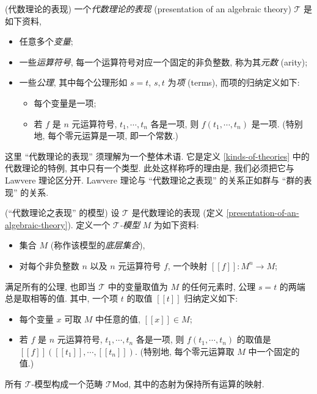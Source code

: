 \begin{definition}
	[label={presentation-of-an-algebraic-theory}]
	{(代数理论的表现)}
	一个\emph{代数理论的表现} (presentation of an algebraic theory) $\mathcal T$ 是如下资料,
	\begin{itemize}
		\item 任意多个\emph{变量};
		\item 一些\emph{运算符号}, 每一个运算符号对应一个固定的非负整数, 称为其\emph{元数} (arity);
		\item 一些\emph{公理}, 其中每个公理形如 $s=t$, $s,t$ 为\emph{项} (terms)\footnotemark{}, 而项的归纳定义如下:
		\begin{itemize}
			\item 每个变量是一项;
			\item 若 $f$ 是 $n$ 元运算符号, $t_1,\cdots,t_n$ 各是一项, 则 $f(t_1,\cdots,t_n)$ 是一项. (特别地, 每个零元运算是一项, 即一个常数.)
		\end{itemize}
	\end{itemize}
\end{definition}

\begin{remark}
	{}
	这里 ``代数理论的表现'' 须理解为一个整体术语. 它是定义 \ref{kinds-of-theories} 中的代数理论的特例, 其中只有一个类型. 此处这样称呼的理由是, 我们必须把它与 Lawvere 理论区分开. Lawvere 理论与 ``代数理论之表现'' 的关系正如群与 ``群的表现'' 的关系.
\end{remark}

\begin{definition}
	{(``代数理论之表现'' 的模型)}
	设 $\mathcal T$ 是代数理论的表现 (定义 \ref{presentation-of-an-algebraic-theory}). 定义一个 \emph{$\mathcal T$-模型} $M$ 为如下资料:
	\begin{itemize}
		\item 集合 $M$ (称作该模型的\emph{底层集合}),
		\item 对每个非负整数 $n$ 以及 $n$ 元运算符号 $f$, 一个映射 $[[f]]\colon M^n\to M$;
	\end{itemize}
	满足所有的公理, 也即当 $\mathcal T$ 中的变量取值为 $M$ 的任何元素时, 公理 $s=t$ 的两端总是取相等的值. 其中, 一个项 $t$ 的取值 $[[t]]$ 归纳定义如下:
	\begin{itemize}
		\item 每个变量 $x$ 可取 $M$ 中任意的值, $[[x]]\in M$;
		\item 若 $f$ 是 $n$ 元运算符号, $t_1,\cdots,t_n$ 各是一项, 则 $f(t_1,\cdots,t_n)$ 的取值是 $[[f]]([[t_1]],\cdots, [[t_n]])$. (特别地, 每个零元运算取 $M$ 中一个固定的值.)
	\end{itemize}
	所有 $\mathcal T$-模型构成一个范畴 $\mathcal T\mathsf {Mod}$, 其中的态射为保持所有运算的映射.
\end{definition}

